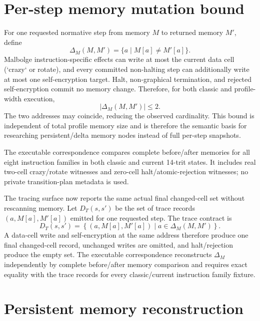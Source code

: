 \documentclass{article}
\begin{document}
\section{Per-step memory mutation bound}

For one requested normative step from memory $M$ to returned memory $M'$, define
\[
  \Delta_M(M,M')=\{a\mid M[a]\neq M'[a]\}.
\]
Malbolge instruction-specific effects can write at most the current data cell
(`crazy` or rotate), and every committed non-halting step can additionally write
at most one self-encryption target. Halt, non-graphical termination, and rejected
self-encryption commit no memory change. Therefore, for both classic and
profile-width execution,
\begin{equation}
  \left|\Delta_M(M,M')\right|\leq2.
  \label{eq:state-graph-two-cell-memory-delta}
\end{equation}
The two addresses may coincide, reducing the observed cardinality. This bound is
independent of total profile memory size and is therefore the semantic basis for
researching persistent/delta memory nodes instead of full per-step snapshots.

The executable correspondence compares complete before/after memories for all
eight instruction families in both classic and current 14-trit states. It
includes real two-cell crazy/rotate witnesses and zero-cell halt/atomic-rejection
witnesses; no private transition-plan metadata is used.

The tracing surface now reports the same actual final changed-cell set without
rescanning memory. Let $D_T(s,s')$ be the set of trace records
$(a,M[a],M'[a])$ emitted for one requested step. The trace contract is
\begin{equation}
  D_T(s,s')
    = \left\{(a,M[a],M'[a])\mid a\in\Delta_M(M,M')\right\}.
  \label{eq:state-graph-trace-memory-delta}
\end{equation}
A data-cell write and self-encryption at the same address therefore produce one
final changed-cell record, unchanged writes are omitted, and halt/rejection
produce the empty set. The executable correspondence reconstructs
$\Delta_M$ independently by complete before/after memory comparison and requires
exact equality with the trace records for every classic/current instruction
family fixture.

\section{Persistent memory reconstruction}
\end{document}
